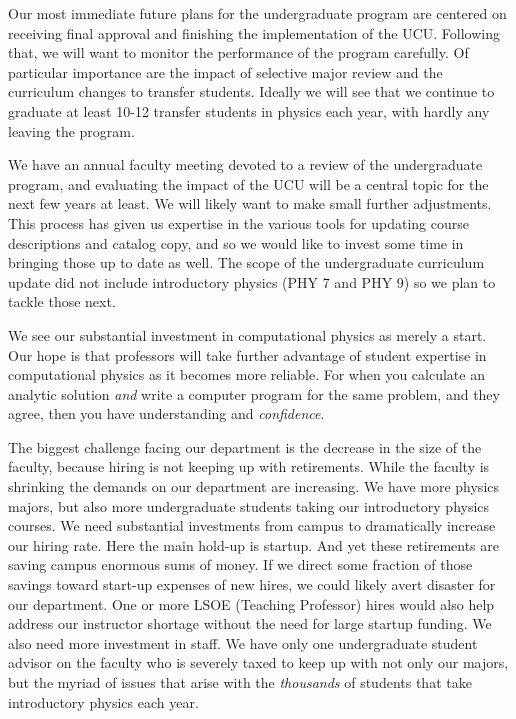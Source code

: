 \documentclass[12pt]{article}
\begin{document}
Our most immediate future plans for the undergraduate program are
centered on receiving final approval and finishing the implementation
of the UCU.  Following that, we will want to monitor the performance
of the program carefully.  Of particular importance are the impact of
selective major review and the curriculum changes to transfer
students.  Ideally we will see that we continue to graduate at least
10-12 transfer students in physics each year, with hardly any leaving
the program.

We have an annual faculty meeting devoted to a review of the
undergraduate program, and evaluating the impact of the UCU will be a
central topic for the next few years at least.  We will likely want to
make small further adjustments.  This process has given us expertise
in the various tools for updating course descriptions and catalog
copy, and so we would like to invest some time in bringing those up to
date as well.  The scope of the undergraduate curriculum update did
not include introductory physics (PHY 7 and PHY 9) so we plan to
tackle those next.

We see our substantial investment in computational physics as merely a
start.  Our hope is that professors will take further advantage of
student expertise in computational physics as it becomes more
reliable.  For when you calculate an analytic solution {\em and} write
a computer program for the same problem, and they agree, then you have
understanding and {\em confidence}.

The biggest challenge facing our department is the decrease in the
size of the faculty, because hiring is not keeping up with
retirements.  While the faculty is shrinking the demands on our
department are increasing.  We have more physics majors, but also more
undergraduate students taking our introductory physics courses.  We
need substantial investments from campus to dramatically increase our
hiring rate.  Here the main hold-up is startup.  And yet these
retirements are saving campus enormous sums of money.  If we direct
some fraction of those savings toward start-up expenses of new hires,
we could likely avert disaster for our department.  One or more LSOE
(Teaching Professor) hires would also help address our instructor
shortage without the need for large startup funding.  We also need more
investment in staff.  We have only one undergraduate student advisor
on the faculty who is severely taxed to keep up with not only our
majors, but the myriad of issues that arise with the {\em thousands}
of students that take introductory physics each year.
\end{document}
